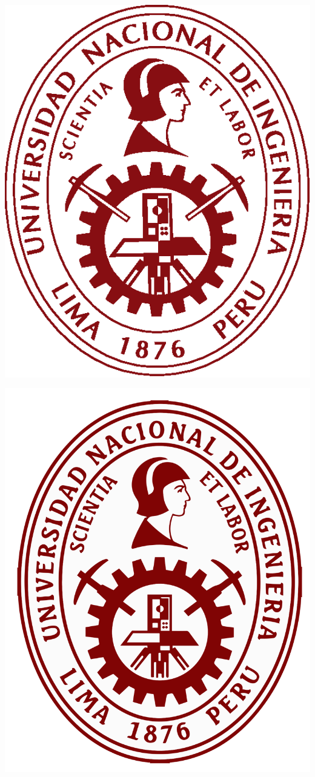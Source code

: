 \documentclass{article}
\begin{document}
\includegraphics[scale=0.3]{logouni}

\newpage

\begin{center}
\includegraphics[scale=0.1]{logo}
\end{center}
\end{document}
